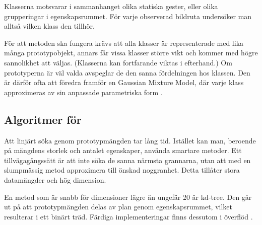 \documentclass[../rapport_MVEX01-11-05]{subfiles}
\begin{document}
Klasserna motsvarar i sammanhanget olika statiska gester,
eller olika grupperingar i egenskapsrummet. För
varje observerad bildruta undersöker man alltså vilken klass den tillhör.

För att metoden ska fungera krävs att alla klasser är representerade med lika
många prototypobjekt, annars får vissa klasser större vikt och kommer med högre
sannolikhet att väljas. (Klasserna kan fortfarande viktas i efterhand.)
Om prototyperna är väl valda avspeglar de den sanna
fördelningen hos klassen.
Den är därför ofta att föredra framför en Gaussian Mixture Model, där
varje klass approximeras av sin anpassade parametriska form \cite{Hastie09}.

\subsection{Algoritmer för \knn}
Att linjärt söka genom prototypmängden tar lång tid.
Istället kan man, beroende på mängdens storlek och antalet egenskaper,
använda smartare metoder.
Ett tillvägagångssätt är att inte söka de sanna närmsta grannarna,
utan att med en slumpmässig metod approximera till önskad noggranhet.
Detta tillåter stora datamängder och hög dimension.

En metod som är snabb för dimensioner lägre än ungefär 20 är kd-tree.
Den går ut på att prototypmängden delas av plan genom egenskapsrummet,
vilket resulterar i ett binärt träd. Färdiga implementeringar finns dessutom
i överflöd \cite{Skiena08}.

%

\end{document}
